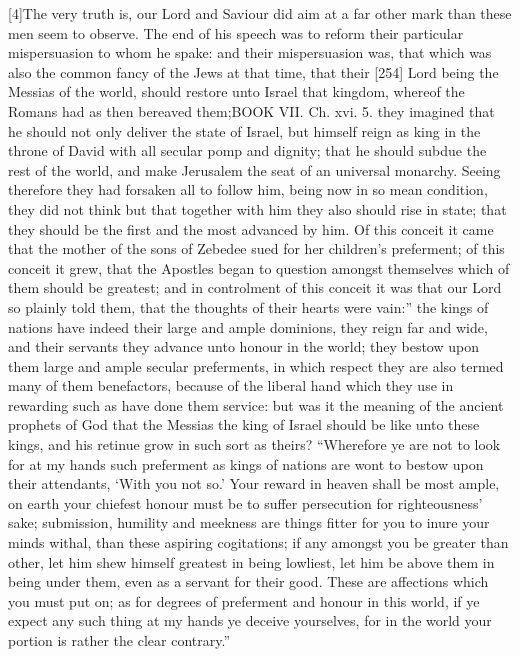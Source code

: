 [4]The very truth is, our Lord and Saviour did aim at a far other mark than these men seem to observe. The end of his speech was to reform their particular mispersuasion to whom he spake: and their mispersuasion was, that which was also the common fancy of the Jews at that time, that their [254] Lord being the Messias of the world, should restore unto Israel that kingdom, whereof the Romans had as then bereaved them;BOOK VII. Ch. xvi. 5. they imagined that he should not only deliver the state of Israel, but himself reign as king in the throne of David with all secular pomp and dignity; that he should subdue the rest of the world, and make Jerusalem the seat of an universal monarchy. Seeing therefore they had forsaken all to follow him, being now in so mean condition, they did not think but that together with him they also should rise in state; that they should be the first and the most advanced by him. Of this conceit it came that the mother of the sons of Zebedee sued for her children’s preferment; of this conceit it grew, that the Apostles began to question amongst themselves which of them should be greatest; and in controlment of this conceit it was that our Lord so plainly told them, that the thoughts of their hearts were vain:” the kings of nations have indeed their large and ample dominions, they reign far and wide, and their servants they advance unto honour in the world; they bestow upon them large and ample secular preferments, in which respect they are also termed many of them benefactors, because of the liberal hand which they use in rewarding such as have done them service: but was it the meaning of the ancient prophets of God that the Messias the king of Israel should be like unto these kings, and his retinue grow in such sort as theirs? “Wherefore ye are not to look for at my hands such preferment as kings of nations are wont to bestow upon their attendants, ‘With you not so.’ Your reward in heaven shall be most ample, on earth your chiefest honour must be to suffer persecution for righteousness’ sake; submission, humility and meekness are things fitter for you to inure your minds withal, than these aspiring cogitations; if any amongst you be greater than other, let him shew himself greatest in being lowliest, let him be above them in being under them, even as a servant for their good. These are affections which you must put on; as for degrees of preferment and honour in this world, if ye expect any such thing at my hands ye deceive yourselves, for in the world your portion is rather the clear contrary.”

